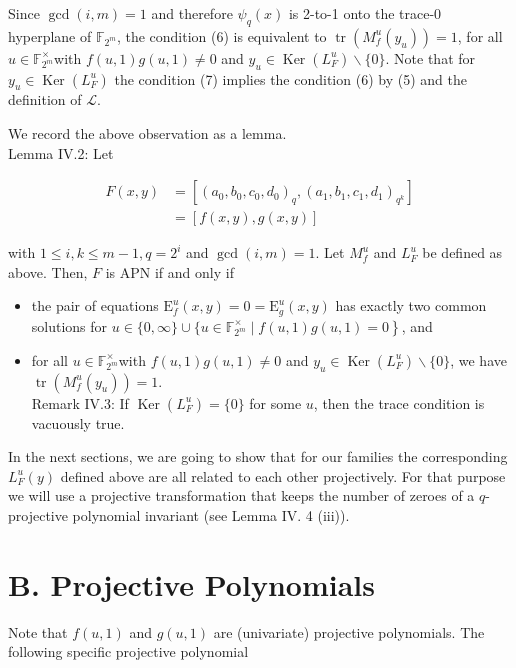 \documentclass[10pt]{article}
\begin{document}
Since $\operatorname{gcd}(i, m)=1$ and therefore $\psi_{q}(x)$ is 2-to-1 onto the trace-0 hyperplane of $\mathbb{F}_{2^{m}}$, the condition (6) is equivalent to $\operatorname{tr}\left(M_{f}^{u}\left(y_{u}\right)\right)=1$, for all $u \in \mathbb{F}_{2^{m}}^{\times}$with $f(u, 1) g(u, 1) \neq 0$ and $y_{u} \in \operatorname{Ker}\left(L_{F}^{u}\right) \backslash\{0\}$. Note that for $y_{u} \in \operatorname{Ker}\left(L_{F}^{u}\right)$ the condition (7) implies the condition (6) by (5) and the definition of $\mathcal{L}$.

We record the above observation as a lemma.\\
Lemma IV.2: Let

$$
\begin{aligned}
F(x, y) & =\left[\left(a_{0}, b_{0}, c_{0}, d_{0}\right)_{q},\left(a_{1}, b_{1}, c_{1}, d_{1}\right)_{q^{k}}\right] \\
& =[f(x, y), g(x, y)]
\end{aligned}
$$

with $1 \leq i, k \leq m-1, q=2^{i}$ and $\operatorname{gcd}(i, m)=1$. Let $M_{f}^{u}$ and $L_{F}^{u}$ be defined as above. Then, $F$ is APN if and only if

\begin{itemize}
  \item the pair of equations $\mathrm{E}_{f}^{u}(x, y)=0=\mathrm{E}_{g}^{u}(x, y)$ has exactly two common solutions for $u \in\{0, \infty\} \cup\{u \in \left.\mathbb{F}_{2^{m}}^{\times} \mid f(u, 1) g(u, 1)=0\right\}$, and
  \item for all $u \in \mathbb{F}_{2^{m}}^{\times}$with $f(u, 1) g(u, 1) \neq 0$ and $y_{u} \in \operatorname{Ker}\left(L_{F}^{u}\right) \backslash\{0\}$, we have $\operatorname{tr}\left(M_{f}^{u}\left(y_{u}\right)\right)=1$.\\
Remark IV.3: If $\operatorname{Ker}\left(L_{F}^{u}\right)=\{0\}$ for some $u$, then the trace condition is vacuously true.
\end{itemize}

In the next sections, we are going to show that for our families the corresponding $L_{F}^{u}(y)$ defined above are all related to each other projectively. For that purpose we will use a projective transformation that keeps the number of zeroes of a $q$-projective polynomial invariant (see Lemma IV. 4 (iii)).

\section*{B. Projective Polynomials}
Note that $f(u, 1)$ and $g(u, 1)$ are (univariate) projective polynomials. The following specific projective polynomial
\end{document}
